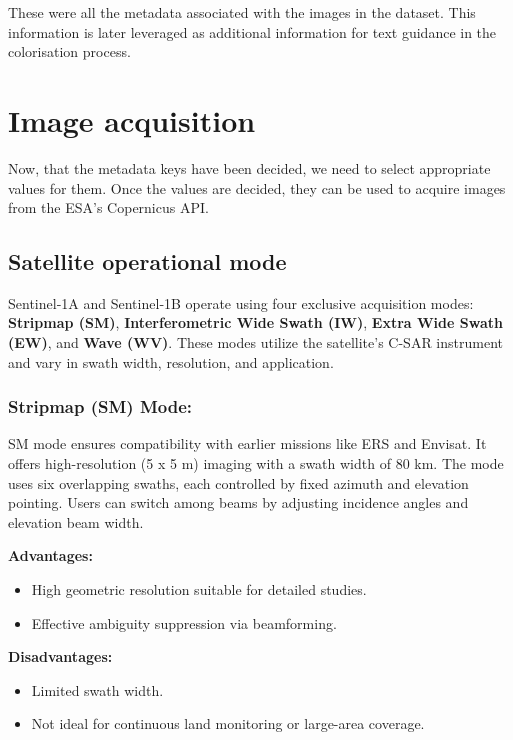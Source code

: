 These were all the metadata associated with the images in the dataset. This information is later leveraged as additional information for text guidance in the colorisation process.

\section{Image acquisition}

Now, that the metadata keys have been decided, we need to select appropriate values for them. Once the values are decided, they can be used to acquire images from the ESA's Copernicus API.

\subsection{\textbf{Satellite operational mode}}


Sentinel‑1A and Sentinel‑1B operate using four exclusive acquisition modes: \textbf{Stripmap (SM)}, \textbf{Interferometric Wide Swath (IW)}, \textbf{Extra Wide Swath (EW)}, and \textbf{Wave (WV)}. These modes utilize the satellite’s C-SAR instrument and vary in swath width, resolution, and application.\cite{eos2024sentinel1}

\subsubsection{Stripmap (SM) Mode:}

SM mode ensures compatibility with earlier missions like ERS and Envisat. It offers high-resolution (5 x 5 m) imaging with a swath width of 80 km. The mode uses six overlapping swaths, each controlled by fixed azimuth and elevation pointing. Users can switch among beams by adjusting incidence angles and elevation beam width.


\textbf{Advantages:}
\begin{itemize}
    \item High geometric resolution suitable for detailed studies.
    \item Effective ambiguity suppression via beamforming.
\end{itemize}

\textbf{Disadvantages:}
\begin{itemize}
    \item Limited swath width.
    \item Not ideal for continuous land monitoring or large-area coverage.
\end{itemize}

